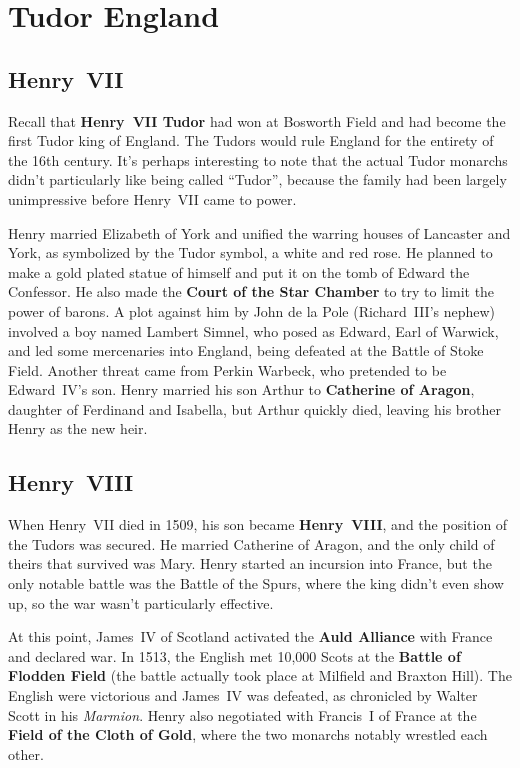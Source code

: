 \section{Tudor England}

\subsection*{Henry~VII}

Recall that \textbf{Henry~VII Tudor} had won at Bosworth Field and had become the first Tudor king of England.
The Tudors would rule England for the entirety of the 16th century.
It's perhaps interesting to note that the actual Tudor monarchs didn't particularly like being called ``Tudor'',
because the family had been largely unimpressive before Henry~VII came to power.

Henry married Elizabeth of York and unified the warring houses of Lancaster and York,
as symbolized by the Tudor symbol, a white and red rose.
He planned to make a gold plated statue of himself and put it on the tomb of Edward the Confessor.
He also made the \textbf{Court of the Star Chamber} to try to limit the power of barons.
A plot against him by John de la Pole (Richard~III's nephew) involved a boy named Lambert Simnel,
who posed as Edward, Earl of Warwick,
and led some mercenaries into England, being defeated at the Battle of Stoke Field.
Another threat came from Perkin Warbeck, who pretended to be Edward~IV's son.
Henry married his son Arthur to \textbf{Catherine of Aragon}, daughter of Ferdinand and Isabella,
but Arthur quickly died, leaving his brother Henry as the new heir.

\subsection*{Henry~VIII}

When Henry~VII died in 1509, his son became \textbf{Henry~VIII}, and the position of the Tudors was secured.
He married Catherine of Aragon, and the only child of theirs that survived was Mary.
Henry started an incursion into France, but the only notable battle was the Battle of the Spurs,
where the king didn't even show up, so the war wasn't particularly effective.

At this point, James~IV of Scotland activated the \textbf{Auld Alliance} with France and declared war.
In 1513, the English met 10,000 Scots at the \textbf{Battle of Flodden Field}
(the battle actually took place at Milfield and Braxton Hill).
The English were victorious and James~IV was defeated, as chronicled by Walter Scott in his \textit{Marmion}.
Henry also negotiated with Francis~I of France at the \textbf{Field of the Cloth of Gold},
where the two monarchs notably wrestled each other.

